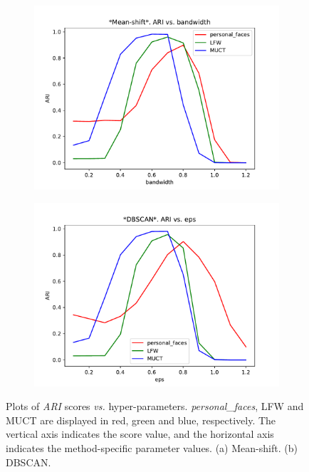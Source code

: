 \documentclass[conference]{IEEEtran}
\begin{document}
\begin{figure}
  \begin{subfigure}[b]{0.45\textwidth}
    \includegraphics[width=\linewidth]{meanshift-plot}
    \caption{}
  \end{subfigure}
  \begin{subfigure}[b]{0.45\textwidth}
    \includegraphics[width=\linewidth]{dbscan-plot}
    \caption{}
  \end{subfigure}
  \caption{Plots of \textit{ARI} scores \textit{vs.} hyper-parameters. \textit{personal\_faces}, LFW and MUCT are displayed in red, green and blue, respectively. The vertical axis indicates the score value, and the horizontal axis indicates the method-specific parameter values. (a) Mean-shift. (b) DBSCAN. }
  \label{parameter_plot}
\end{figure}
\end{document}
